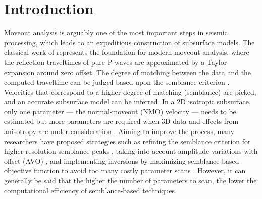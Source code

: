 \section{Introduction}
Moveout analysis is arguably one of the most important steps in seismic processing, which leads to an expeditious construction of subsurface models. The classical work of \cite{taner} represents the foundation for modern moveout analysis, where the reflection traveltimes of pure P waves are approximated by a Taylor expansion around zero offset. The degree of matching between the data and the computed traveltime can be judged based upon the semblance criterion \cite[]{neidell}. Velocities that correspond to a higher degree of matching (semblance) are picked, and an accurate subsurface model can be inferred. In a 2D isotropic subsurface, only one parameter --- the normal-moveout (NMO) velocity --- needs to be estimated but more parameters are required when 3D data and effects from anisotropy are under consideration \cite[]{alkatsvankin,nmoellipse,yilmaz,tsvankinbook,thomsenbook,masmoudiscan,ohscattering}. Aiming to improve the process, many researchers have proposed strategies such as refining the semblance criterion for higher resolution semblance peaks \cite[]{kirlin,kirlinbook,abbad,fomelab,luohale,similaritysemblance,wilsongross}, taking into account amplitude variations with offset (AVO) \cite[]{sarkar2001,sarkar2002,yantsvankin}, and implementing inversions by maximizing semblance-based objective function to avoid too many costly parameter scans \cite[]{grechkatsvankinlathet,vascon}. However, it can generally be said that the higher the number of parameters to scan, the lower the computational efficiency of semblance-based techniques.

